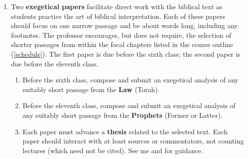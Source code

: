 \documentclass[titlepage]{article}
\begin{document}
\begin{enumerate}
\begin{enumerate}
	\end{enumerate}


	\item Two \textbf{exegetical papers} facilitate direct work with the
	biblical text as students practice the art of biblical
	interpretation. Each of these papers should focus on one narrow
	passage and be about  words long, including any
	footnotes. The professor encourages, but does not require, the
	selection of shorter passages from within the focal chapters listed
	in the course outline (\autoref{schedule}). The first paper is due
	before the sixth class; the second paper is due before the eleventh
	class.


	\begin{enumerate}

		\item Before the sixth class, compose and submit an exegetical
		analysis of any suitably short passage from the \textbf{Law}
		(Torah).

		\item Before the eleventh class, compose and submit an
		exegetical analysis of any suitably short passage from the
		\textbf{Prophets} (Former or Latter).
		
		\item Each paper must advance a \textbf{thesis} related to the
		selected text. Each paper should interact with at least  sources or commentators, not counting lectures
		(which need not be cited). See me and \cite[chs. 3, 5, 8,
		11]{rlgs} for guidance.


\end{enumerate}
\end{enumerate}
\end{document}
